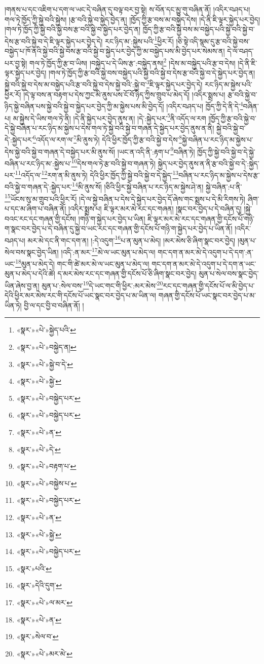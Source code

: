 །གནས་པ་དང་འཇིག་པ་དག་ལ་ཡང་དེ་བཞིན་དུ་བལྟ་བར་བྱ་སྟེ། ས་བོན་དང་མྱུ་གུ་བཞིན་ནོ། །འདིར་བཤད་པ། གལ་ཏེ་ཁྱོད་ཀྱི་སྐྱེ་བའི་སྐྱེས། །རྩ་བའི་སྐྱེ་བ་སྐྱེད་བྱེད་ན། །ཁྱོད་ཀྱི་རྩ་བས་མ་བསྐྱེད་དེས། །དེ་ནི་ཇི་ལྟར་སྐྱེད་པར་བྱེད། །གལ་ཏེ་ཁྱོད་ཀྱི་སྐྱེ་བའི་སྐྱེ་བས་རྩ་བའི་སྐྱེ་བ་སྐྱེད་པར་བྱེད་ན། ཁྱོད་ཀྱི་རྩ་བའི་སྐྱེ་བས་མ་བསྐྱེད་པའི་སྐྱེ་བའི་སྐྱེ་བ་དེས་རྩ་བའི་སྐྱེ་བ་དེ་ཇི་ལྟར་སྐྱེད་པར་བྱེད་དེ། རང་ཉིད་མ་:སྐྱེས་པའི་\footnote{«སྣར་»«པེ་»སྐྱེད་པའི་}ཕྱིར་རོ། །ཅི་སྟེ་འདི་སྙམ་དུ་རྩ་བའི་སྐྱེ་བས་བསྐྱེད་པ་ཁོ་ནའི་སྐྱེ་བའི་སྐྱེ་བས་རྩ་བའི་སྐྱེ་བ་སྐྱེད་པར་བྱེད་ཀྱི་མ་བསྐྱེད་པས་མི་བྱེད་པར་སེམས་ན། དེ་ལ་བཤད་པར་བྱ་སྟེ། གལ་ཏེ་ཁྱོད་ཀྱི་རྩ་བ་ཡིས། །བསྐྱེད་པ་དེ་ཡིས་རྩ་:བསྐྱེད་ནས།\footnote{«སྣར་»«པེ་»བསྐྱེད་ན།} །དེས་མ་བསྐྱེད་པའི་རྩ་བ་དེས། །དེ་ནི་ཇི་ལྟར་སྐྱེད་པར་བྱེད། །གལ་ཏེ་ཁྱོད་ཀྱི་རྩ་བའི་སྐྱེ་བས་བསྐྱེད་པའི་སྐྱེ་བའི་སྐྱེ་བ་དེས་རྩ་བའི་སྐྱེ་བ་དེ་སྐྱེད་པར་བྱེད་ན། སྐྱེ་བའི་སྐྱེ་བ་དེས་མ་བསྐྱེད་པའི་རྩ་བའི་སྐྱེ་བ་དེས་སྐྱེ་བའི་:སྐྱེ་བ་\footnote{«སྣར་»«པེ་»སྐྱེ་བ་དེ་}ཇི་ལྟར་སྐྱེད་པར་བྱེད་དེ། རང་ཉིད་མ་སྐྱེས་པའི་ཕྱིར་རོ། །དེ་ལྟ་བས་ན་བརྟག་པ་དེས་ཀྱང་མི་ནུས་པས་ངོ་བོ་ཉིད་ཀྱིས་གྲུབ་པ་མེད་དོ། །འདིར་སྨྲས་པ། རྩ་བའི་སྐྱེ་བ་ཉིད་སྐྱེ་བཞིན་པས་སྐྱེ་བའི་སྐྱེ་བ་སྐྱེད་པར་བྱེད་ཀྱི་མ་སྐྱེས་པས་མི་བྱེད་དོ། །འདིར་བཤད་པ། ཁྱོད་ཀྱི་དེ་ནི་དེ་\footnote{«སྣར་»«པེ་»སྐྱེ་}བཞིན་པ། མ་སྐྱེས་དེ་ཡིས་གལ་ཏེ་ནི། །དེ་ནི་སྐྱེད་པར་བྱེད་ནུས་ན། །དེ་:སྐྱེད་པར་\footnote{«སྣར་»«པེ་»བསྐྱེད་པར་}ནི་འདོད་ལ་རག །ཁྱོད་ཀྱི་རྩ་བའི་སྐྱེ་བ་དེ་སྐྱེ་བཞིན་པ་རང་ཉིད་མ་སྐྱེས་པ་དེས་གལ་ཏེ་སྐྱེ་བའི་སྐྱེ་བ་གཞན་དེ་སྐྱེད་པར་བྱེད་ནུས་ན་ནི། སྐྱེ་བའི་སྐྱེ་བ་དེ་:སྐྱེད་པར་\footnote{«སྣར་»«པེ་»བསྐྱེད་པར་}འདོད་ལ་རག་ལ་\footnote{«སྣར་»«པེ་»ན་}མི་ནུས་ཏེ། དེའི་ཕྱིར་ཁྱོད་ཀྱི་རྩ་བའི་སྐྱེ་བ་དེས་\footnote{«སྣར་»«པེ་»དེ་}སྐྱེ་བཞིན་པ་རང་ཉིད་མ་སྐྱེས་པ་དེས་སྐྱེ་བའི་སྐྱེ་བ་གཞན་དེ་བསྐྱེད་པར་མི་ནུས་སོ། །ཡང་ན་འདི་ནི་:རྟག་པ་\footnote{«སྣར་»«པེ་»བརྟག་པ་}བཞིན་ཏེ། ཁྱོད་ཀྱི་སྐྱེ་བའི་སྐྱེ་བ་དེ་སྐྱེ་བཞིན་པ་རང་ཉིད་མ་:སྐྱེས་པ་\footnote{«སྣར་»«པེ་»བསྐྱེས་པ་}དེས་གལ་ཏེ་རྩ་བའི་སྐྱེ་བ་གཞན་ཏེ། སྐྱེད་པར་བྱེད་ནུས་ན་ནི་རྩ་བའི་སྐྱེ་བ་དེ་:སྐྱེད་པར་\footnote{«སྣར་»«པེ་»བསྐྱེད་པར་}འདོད་ལ་\footnote{«སྣར་»«པེ་»ན་}རག་ན་མི་ནུས་ཏེ། དེའི་ཕྱིར་ཁྱོད་ཀྱི་སྐྱེ་བའི་སྐྱེ་བ་དེ་སྐྱེད་\footnote{«སྣར་»«པེ་»སྐྱེ་}བཞིན་པ་རང་ཉིད་མ་སྐྱེས་པ་དེས་རྩ་བའི་སྐྱེ་བ་གཞན་དེ་:སྐྱེད་པར་\footnote{«སྣར་»«པེ་»བསྐྱེད་པར་}མི་ནུས་སོ། །ཅིའི་ཕྱིར་སྐྱེ་བཞིན་པ་རང་ཉིད་མ་སྐྱེས་ཤེ་ན། སྐྱེ་བཞིན་:པ་ནི་\footnote{«སྣར་»པའི་}ཡོངས་སུ་མ་གྲུབ་པའི་ཕྱིར་རོ། །དེ་ལ་སྐྱེ་བཞིན་པ་དེས་དེ་སྐྱེད་པར་བྱེད་དོ་ཞེས་གང་སྨྲས་པ་དེ་མི་རིགས་ཏེ། ཞིག་པ་དང་མ་ཞིག་པ་བཞིན་ནོ། །འདིར་སྨྲས་པ། ཇི་ལྟར་མར་མེ་རང་དང་གཞན། །སྣང་བར་བྱེད་པ་དེ་བཞིན་དུ། །སྐྱེ་བའང་རང་དང་གཞན་གྱི་དངོས། །གཉི་ག་སྐྱེད་པར་བྱེད་པ་ཡིན། ཇི་ལྟར་མར་མེ་རང་དང་གཞན་གྱི་དངོས་པོ་གཉི་ག་སྣང་བར་བྱེད་པ་དེ་བཞིན་དུ་སྐྱེ་བ་ཡང་རང་དང་གཞན་གྱི་དངོས་པོ་གཉི་ག་སྐྱེད་པར་བྱེད་པ་ཡིན་ནོ། །འདིར་བཤད་པ། མར་མེ་དང་ནི་གང་དག་ན། །:དེ་འདུག་\footnote{«སྣར་»དེའི་དུག་}པ་ན་མུན་པ་མེད། །མར་མེས་ཅི་ཞིག་སྣང་བར་བྱེད། །མུན་པ་སེལ་བས་སྣང་བྱེད་ཡིན། །འདི་:ན་མར་\footnote{«སྣར་»«པེ་»ལ་མར་}མེ་ལ་ཡང་མུན་པ་མེད་ལ། གང་དག་ན་མར་མེ་དེ་འདུག་པ་དེ་དག་:ན་ཡང་\footnote{«སྣར་»«པེ་»ན་}མུན་པ་མེད་དེ། གང་གི་ཚེ་མར་མེ་ལ་ཡང་མུན་པ་མེད་ལ། གང་དག་ན་མར་མེ་དེ་འདུག་པ་དེ་དག་ན་ཡང་མུན་པ་མེད་པ་དེའི་ཚེ། ད་མར་མེས་རང་དང་གཞན་གྱི་དངོས་པོ་ཅི་ཞིག་སྣང་བར་བྱེད། མུན་པ་སེལ་བས་སྣང་བྱེད་ཡིན་ཞེས་བྱ་ན། མུན་པ་:སེལ་བས་\footnote{«སྣར་»སེལ་བ་}དེ་ཡང་གང་གི་ཕྱིར་:མར་མེས་\footnote{«སྣར་»«པེ་»མར་མེ་}རང་དང་གཞན་གྱི་དངོས་པོ་ལ་མི་བྱེད་པ་དེའི་ཕྱིར་མར་མེས་རང་གི་དངོས་པོ་ཡང་སྣང་བར་བྱེད་པ་མ་ཡིན་ལ། གཞན་གྱི་དངོས་པོ་ཡང་སྣང་བར་བྱེད་པ་མ་ཡིན་ཏེ། བྱི་ལ་དང་བྱི་བ་བཞིན་ནོ། །
